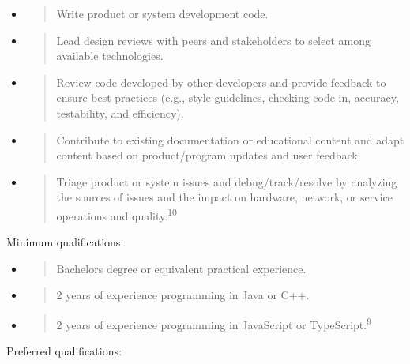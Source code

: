 \documentclass[12pt,a4paper]{article}
\begin{document}
\begin{itemize}
\item
  \begin{quote}
  Write product or system development code.
  \end{quote}
\item
  \begin{quote}
  Lead design reviews with peers and stakeholders to select among
  available technologies.
  \end{quote}
\item
  \begin{quote}
  Review code developed by other developers and provide feedback to
  ensure best practices (e.g., style guidelines, checking code in,
  accuracy, testability, and efficiency).
  \end{quote}
\item
  \begin{quote}
  Contribute to existing documentation or educational content and adapt
  content based on product/program updates and user feedback.
  \end{quote}
\item
  \begin{quote}
  Triage product or system issues and debug/track/resolve by analyzing
  the sources of issues and the impact on hardware, network, or service
  operations and quality.\textsuperscript{10}
  \end{quote}
\end{itemize}

Minimum qualifications:

\begin{itemize}
\item
  \begin{quote}
  Bachelor\textquotesingle s degree or equivalent practical experience.
  \end{quote}
\item
  \begin{quote}
  2 years of experience programming in Java or C++.
  \end{quote}
\item
  \begin{quote}
  2 years of experience programming in JavaScript or
  TypeScript.\textsuperscript{9}
  \end{quote}
\end{itemize}

Preferred qualifications:
\end{document}
